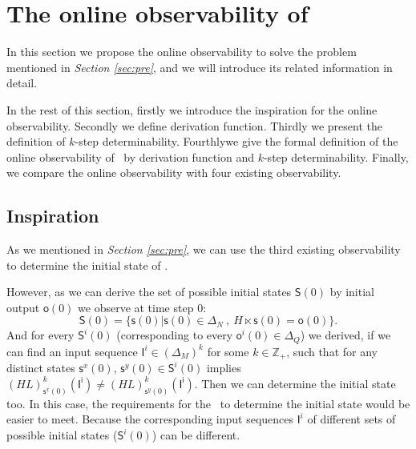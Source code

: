 \section{The online observability of \BCNs}
\label{sec:online}


In this section we propose the online observability to solve the problem mentioned in {\em Section \ref{sec:pre}}, and we will introduce its related information in detail. 

In the rest of this section, firstly we introduce the inspiration for the online observability. Secondly we define derivation function. Thirdly we present the definition of $k$-step determinability. Fourthlywe give the formal definition of the online observability of \BCNs\ by derivation function and $k$-step determinability. Finally, we compare the online observability with four existing observability.


\subsection{Inspiration}


As we mentioned in {\em Section \ref{sec:pre}}, we can use the third existing observability to determine the initial state of \BCN. 

However, as we can derive the set of possible initial states $\mathsf{S}(0)$ by initial output $\mathsf{o}(0)$ we observe at time step $0$:
\[\mathsf{S}(0)=\{\mathsf{s}(0)|\mathsf{s}(0)\in \Delta_N\ ,\ H\ltimes \mathsf{s}(0)=\mathsf{o}(0)\}.\]
And for every $\mathsf{S}^{i}(0)$ (corresponding to every $\mathsf{o}^{i}(0)\in \Delta_Q$) we derived, if we can find an input sequence $\mathsf{I}^{i}\in(\Delta_M)^k$ for some $k\in \mathbb{Z}_+$, such that for any distinct states $\mathsf{s}^{x}(0)$, $\mathsf{s}^{y}(0) \in \mathsf{S}^{i}(0)$ implies $(HL)^k_{\mathsf{s}^{x}(0)}(\mathsf{I^i})\neq (HL)^k_{\mathsf{s}^{y}(0)}(\mathsf{I^i})$. 
Then we can determine the initial state too. 
In this case, the requirements for the \BCN\ to determine the initial state would be easier to meet. Because the corresponding input sequences $\mathsf{I}^{i}$ of different sets of possible initial states ($\mathsf{S}^{i}(0)$) can be different. 

